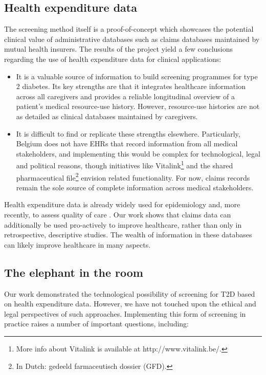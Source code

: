 \subsection{Health expenditure data}
The screening method itself is a proof-of-concept which showcases the potential clinical value of administrative databases such as claims databases maintained by mutual health insurers. The results of the project yield a few conclusions regarding the use of health expenditure data for clinical applications:

\begin{itemize}
\item It is a valuable source of information to build screening programmes for type 2 diabetes. Its key strengths are that it integrates healthcare information across all caregivers and provides a reliable longitudinal overview of a patient's medical resource-use history. However, resource-use histories are not as detailed as clinical databases maintained by caregivers.
\item It is difficult to find or replicate these strengths elsewhere. Particularly, Belgium does not have EHRs that record information from all medical stakeholders, and implementing this would be complex for technological, legal and political reasons, though initiatives like Vitalink\footnote{More info about Vitalink is available at http://www.vitalink.be/.} and the shared pharmaceutical file\footnote{In Dutch: gedeeld farmaceutisch dossier (GFD).} envision related functionality. For now, claims records remain the sole source of complete information across medical stakeholders.
\end{itemize}

Health expenditure data is already widely used for epidemiology \citep{pladevall2004clinical,lee2006medication,garg2010acute,s23} and, more recently, to assess quality of care \citep{kcequality}. Our work shows that claims data can additionally be used pro-actively to improve healthcare, rather than only in retrospective, descriptive studies. The wealth of information in these databases can likely improve healthcare in many aspects.


\subsection{The elephant in the room}
Our work demonstrated the technological possibility of screening for T2D based on health expenditure data. However, we have not touched upon the ethical and legal perspectives of such approaches. Implementing this form of screening in practice raises a number of important questions, including:

